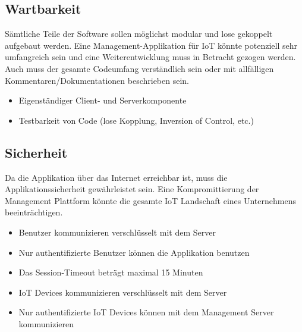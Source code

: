 \subsection{Wartbarkeit}
Sämtliche Teile der Software sollen möglichst modular und lose gekoppelt aufgebaut werden. Eine Management-Applikation für IoT könnte potenziell sehr umfangreich sein und eine Weiterentwicklung muss in Betracht gezogen werden. Auch muss der gesamte Codeumfang verständlich sein oder mit allfälligen Kommentaren/Dokumentationen beschrieben sein.
\begin{itemize}
\item Eigenständiger Client- und Serverkomponente
\item Testbarkeit von Code (lose Kopplung, Inversion of Control, etc.)
\end{itemize}

\subsection{Sicherheit}
Da die Applikation über das Internet erreichbar ist, muss die Applikationssicherheit gewährleistet sein. Eine Kompromittierung der Management Plattform könnte die gesamte IoT Landschaft eines Unternehmens beeinträchtigen.

\begin{itemize}
\item Benutzer kommunizieren verschlüsselt mit dem Server
\item Nur authentifizierte Benutzer können die Applikation benutzen
\item Das Session-Timeout beträgt maximal 15 Minuten
\item IoT Devices kommunizieren verschlüsselt mit dem Server
\item Nur authentifizierte IoT Devices können mit dem Management Server kommunizieren
\end{itemize}